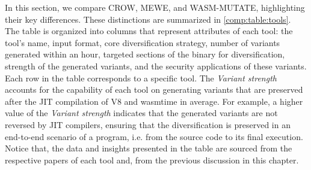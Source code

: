 

In this section, we compare CROW, MEWE, and WASM-MUTATE, highlighting their key differences. 
These distinctions are summarized in \autoref{comp:table:tools}. 
The table is organized into columns that represent attributes of each tool: the tool's name, input format, core diversification strategy, number of variants generated within an hour, targeted sections of the \Wasm binary for diversification, strength of the generated variants, and the security applications of these variants. 
Each row in the table corresponds to a specific tool. 
The \emph{Variant strength} accounts for the capability of each tool on generating variants that are preserved after the JIT compilation of V8 and wasmtime in average.
For example, a higher value of the \emph{Variant strength} indicates that the generated variants are not reversed by JIT compilers, ensuring that the diversification is preserved in an end-to-end scenario of a \Wasm program, i.e. from the source code to its final execution.
Notice that, the data and insights presented in the table are sourced from the respective papers of each tool and, from the previous discussion in this chapter.



